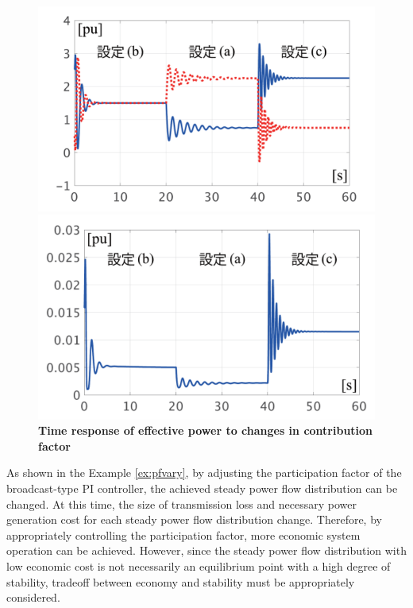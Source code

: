 \documentclass[tombow,dvipdfmx]{corona-a5-1.1}
\begin{document}
\begin{figure}[t]
  \centering
  {
  \begin{minipage}{0.49\linewidth}
    \centering
    \includegraphics[width = 1.0\linewidth]{figs/varyalphaP}
  \end{minipage}
  \begin{minipage}{0.49\linewidth}
    \centering
    \includegraphics[width = 1.0\linewidth]{figs/varyalphaloss}
  \end{minipage}
  \medskip
  \caption{\textbf{Time response of effective power to changes in contribution factor} }
  \label{fig:agcPvary}
  }
\medskip
\end{figure}


As shown in the Example \ref{ex:pfvary}, by adjusting the participation factor of the broadcast-type PI controller, the achieved steady power flow distribution can be changed.
At this time, the size of transmission loss and necessary power generation cost for each steady power flow distribution change.
Therefore, by appropriately controlling the participation factor, more economic system operation can be achieved.
However, since the steady power flow distribution with low economic cost is not necessarily an equilibrium point with a high degree of stability, tradeoff between economy and stability must be appropriately considered.
\end{document}
